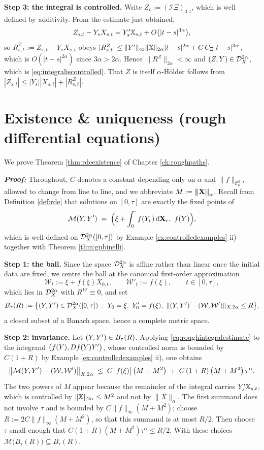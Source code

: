 \medskip
\noindent\textbf{Step 3: the integral is controlled.} Write $Z_t := (\mathcal{I}\Xi)_{0,t}$, which is
well defined by additivity. From the estimate just obtained,
\[
Z_{s,t} - Y_sX_{s,t} = Y'_s\mathbb{X}_{s,t} + O\bigl(|t-s|^{3\alpha}\bigr),
\]
so $R^{Z}_{s,t} := Z_{s,t}-Y_sX_{s,t}$ obeys
$|R^Z_{s,t}| \leq \lVert Y'\rVert_{\infty}\lVert\mathbb{X}\rVert_{2\alpha}|t-s|^{2\alpha} + C\,C_\Xi|t-s|^{3\alpha}$,
which is $O(|t-s|^{2\alpha})$ since $3\alpha>2\alpha$. Hence $\lVert R^Z\rVert_{2\alpha}<\infty$ and
$(Z,Y)\in\mathcal{D}^{2\alpha}_{X}$, which is \eqref{eq:integraliscontrolled}. That $Z$ is itself $\alpha$-Hölder
follows from $|Z_{s,t}| \leq |Y_s||X_{s,t}| + |R^Z_{s,t}|$. \qedfilledtext

\section{Existence \& uniqueness  (rough differential equations)}\label{app:proof:rdeexistence}
We prove Theorem \ref{thm:rdeexistence} of Chapter \ref{ch:roughpaths}.

\textbf{\textit{Proof:}} Throughout, $C$ denotes a constant depending only on $\alpha$ and
$\lVert f\rVert_{\mathcal{C}^3_b}$, allowed to change from line to line, and we abbreviate
$M := {\left\vert\kern-0.25ex\left\vert\kern-0.25ex\left\vert \mathbf{X} \right\vert\kern-0.25ex\right\vert\kern-0.25ex\right\vert}_{\alpha}$. Recall from Definition \ref{def:rde} that solutions on $[0,\tau]$
are exactly the fixed points of
\[
\mathcal{M}(Y,Y') \;=\; \Bigl(\xi + \int_0^{\cdot} f(Y_r)\,d\mathbf{X}_r,\ f(Y)\Bigr),
\]
which is well defined on $\mathcal{D}^{2\alpha}_{X}([0,\tau])$ by Example \ref{ex:controlledexamples} ii) together
with Theorem \ref{thm:gubinelli}.

\medskip
\noindent\textbf{Step 1: the ball.} Since the space $\mathcal{D}^{2\alpha}_{X}$ is affine rather than linear once the
initial data are fixed, we centre the ball at the canonical first-order approximation
\[
\mathcal{W}_t := \xi + f(\xi)X_{0,t}, \qquad \mathcal{W}'_t := f(\xi), \qquad t\in[0,\tau],
\]
which lies in $\mathcal{D}^{2\alpha}_{X}$ with $R^{\mathcal{W}}\equiv0$, and set
\[
B_\tau(R) := \bigl\{ (Y,Y')\in\mathcal{D}^{2\alpha}_{X}([0,\tau]) \;:\; Y_0=\xi,\ Y'_0 = f(\xi),\ \lVert (Y,Y')-(\mathcal{W},\mathcal{W}')\rVert_{X,2\alpha}\leq R \bigr\},
\]
a closed subset of a Banach space, hence a complete metric space.

\medskip
\noindent\textbf{Step 2: invariance.} Let $(Y,Y')\in B_\tau(R)$. Applying
\eqref{eq:roughintegralestimate} to the integrand $\bigl(f(Y),Df(Y)Y'\bigr)$, whose controlled
norm is bounded by $C(1+R)$ by Example \ref{ex:controlledexamples} ii), one obtains
\[
\bigl\lVert \mathcal{M}(Y,Y') - (\mathcal{W},\mathcal{W}')\bigr\rVert_{X,2\alpha}
\;\leq\; C\,\bigl|f(\xi)\bigr|\,\bigl(M + M^{2}\bigr) \;+\; C\,(1+R)\,\bigl(M+M^{2}\bigr)\,\tau^{\alpha}.
\]
The two powers of $M$ appear because the remainder of the integral carries $Y'_s\mathbb{X}_{s,t}$, which
is controlled by $\lVert\mathbb{X}\rVert_{2\alpha} \leq M^{2}$ and not by $\lVert X\rVert_\alpha$. The first
summand does not involve $\tau$ and is bounded by $C\lVert f\rVert_{\infty}(M+M^2)$; choose
$R := 2C\lVert f\rVert_{\infty}(M+M^{2})$, so that this summand is at most $R/2$. Then choose $\tau$ small
enough that $C(1+R)(M+M^{2})\tau^{\alpha} \leq R/2$. With these choices
$\mathcal{M}\bigl(B_\tau(R)\bigr)\subseteq B_\tau(R)$.

